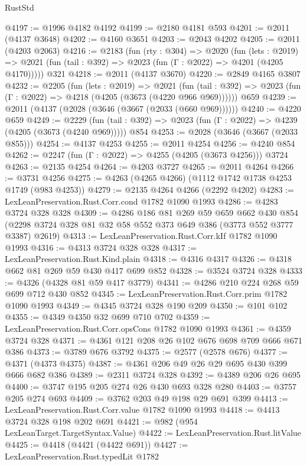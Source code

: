 \begin{lexlean}{RustStd}
\begin{coremodule}
@4197 := @1996 @4182 @4192
@4199 := @2180 @4181 @593
@4201 := @2011 (@4137 @3648)
@4202 := @4160 @3651
@4203 := @2043 @4202
@4205 := @2011 (@4203 @2063)
@4216 := @2183
    (fun (rty : @304) =>
    @2020
      (fun (lets : @2019) =>
      @2021 (fun (tail : @392) => @2023 (fun (Γ : @2022) => @4201 (@4205 @4170)))))
    @321
@4218 := @2011 (@4137 @3670)
@4220 := @2849 @4165 @3807
@4232 := @2205
    (fun (lets : @2019) =>
    @2021 (fun (tail : @392) => @2023 (fun (Γ : @2022) => @4218 (@4205 (@3673 (@4220 @966 @969))))))
    @659
@4239 := @2011 (@4137 (@2028 (@3646 (@3667 (@2033 (@660 @969))))))
@4240 := @4220 @659
@4249 := @2229
    (fun (tail : @392) => @2023 (fun (Γ : @2022) => @4239 (@4205 (@3673 (@4240 @969)))))
    @854
@4253 := @2028 (@3646 (@3667 (@2033 @855)))
@4254 := @4137 @4253
@4255 := @2011 @4254
@4256 := @4240 @854
@4262 := @2247 (fun (Γ : @2022) => @4255 (@4205 (@3673 @4256))) @3724
@4263 := @2135 @4254
@4264 := @4203 @3727
@4265 := @2011 @4264
@4266 := @3731 @4256
@4275 := @4263 (@4265 @4266) (@1112 @1742 @1738 @4253 @1749 (@983 @4253))
@4279 := @2135 @4264 @4266 (@2292 @4202)
@4283 := LexLeanPreservation.Rust.Corr.cond @1782 @1090 @1993
@4286 := @4283 @3724 @328 @328
@4309 := @4286
    @186
    @81
    @269
    @59
    @659
    @662
    @430
    @854
    (@2298 @3724 @328 @81 @32 @58 @552 @373 @649 @386 (@3773 @552 @3777 @3387) @2619)
@4313 := LexLeanPreservation.Rust.Corr.kIf @1782 @1090 @1993
@4316 := @4313 @3724 @328 @328
@4317 := LexLeanPreservation.Rust.Kind.plain
@4318 := @4316 @4317
@4326 := @4318 @662 @81 @269 @59 @430 @417 @699 @852
@4328 := @3524 @3724 @328
@4333 := @4326 (@4328 @81 @59 @417 @3779)
@4341 := @4286 @210 @224 @268 @59 @699 @712 @430 @852
@4345 := LexLeanPreservation.Rust.Corr.prim @1782 @1090 @1993
@4349 := @4345 @3724 @328 @190 @209
@4350 := @101 @102
@4355 := @4349 @4350 @32 @699 @710 @702
@4359 := LexLeanPreservation.Rust.Corr.opsCons @1782 @1090 @1993
@4361 := @4359 @3724 @328
@4371 := @4361 @121 @208 @26 @102 @676 @698 @709 @666 @671 @386
@4373 := @3789 @676 @3792
@4375 := @2577 (@2578 @676)
@4377 := @4371 (@4373 @4375)
@4387 := @4361 @206 @49 @26 @29 @695 @430 @399 @666 @682 @386
@4389 := @2311 @3724 @328
@4392 := @4389 @206 @26 @695
@4400 := @3747 @195 @205 @274 @26 @430 @693 @328 @280
@4403 := @3757 @205 @274 @693
@4409 := @3762 @203 @49 @198 @29 @691 @399
@4413 := LexLeanPreservation.Rust.Corr.value @1782 @1090 @1993
@4418 := @4413 @3724 @328 @198 @202 @691
@4421 := @982 (@954 LexLeanTarget.TargetSyntax.Value)
@4422 := LexLeanPreservation.Rust.litValue
@4425 := @4418 (@4421 (@4422 @691))
@4427 := LexLeanPreservation.Rust.typedLit @1782

\end{coremodule}
\end{lexlean}
